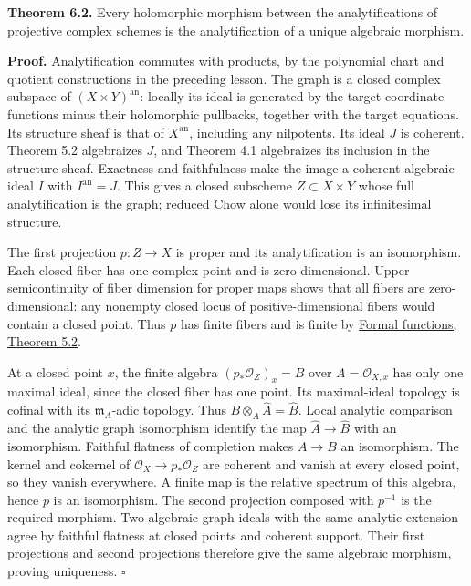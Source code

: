 \documentclass[11pt]{article}
\begin{document}
\textbf{Theorem 6.2.} Every holomorphic morphism between the
analytifications of projective complex schemes is the analytification of
a unique algebraic morphism.

\textbf{Proof.} Analytification commutes with products, by the
polynomial chart and quotient constructions in the preceding lesson. The
graph is a closed complex subspace of \((X\times Y)^{\mathrm{an}}\):
locally its ideal is generated by the target coordinate functions minus
their holomorphic pullbacks, together with the target equations. Its
structure sheaf is that of \(X^{\mathrm{an}}\), including any
nilpotents. Its ideal \(J\) is coherent. Theorem 5.2 algebraizes \(J\),
and Theorem 4.1 algebraizes its inclusion in the structure sheaf.
Exactness and faithfulness make the image a coherent algebraic ideal
\(I\) with \(I^{\mathrm{an}}=J\). This gives a closed subscheme
\(Z\subset X\times Y\) whose full analytification is the graph; reduced
Chow alone would lose its infinitesimal structure.

The first projection \(p:Z\to X\) is proper and its analytification is
an isomorphism. Each closed fiber has one complex point and is
zero-dimensional. Upper semicontinuity of fiber dimension for proper
maps shows that all fibers are zero-dimensional: any nonempty closed
locus of positive-dimensional fibers would contain a closed point. Thus
\(p\) has finite fibers and is finite by
\href{the-theorem-on-formal-functions.html\#5-dimension-and-finiteness-consequences}{Formal
functions, Theorem 5.2}.

At a closed point \(x\), the finite algebra \((p_*\mathcal O_Z)_x=B\)
over \(A=\mathcal O_{X,x}\) has only one maximal ideal, since the closed
fiber has one point. Its maximal-ideal topology is cofinal with its
\(\mathfrak m_A\)-adic topology. Thus
\(B\otimes_A\widehat A=\widehat B\). Local analytic comparison and the
analytic graph isomorphism identify the map \(\widehat A\to\widehat B\)
with an isomorphism. Faithful flatness of completion makes \(A\to B\) an
isomorphism. The kernel and cokernel of
\(\mathcal O_X\to p_*\mathcal O_Z\) are coherent and vanish at every
closed point, so they vanish everywhere. A finite map is the relative
spectrum of this algebra, hence \(p\) is an isomorphism. The second
projection composed with \(p^{-1}\) is the required morphism. Two
algebraic graph ideals with the same analytic extension agree by
faithful flatness at closed points and coherent support. Their first
projections and second projections therefore give the same algebraic
morphism, proving uniqueness. \(\square\)
\end{document}
